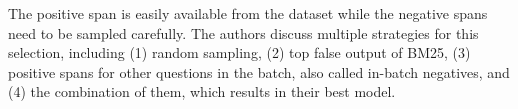 The positive span is easily available from the dataset while the negative spans need to be sampled carefully.
The authors discuss multiple strategies for this selection, including (1) random sampling, (2) top false output of BM25, (3) positive spans for other questions in the batch, also called in-batch negatives, and (4) the combination of them, which results in their best model.